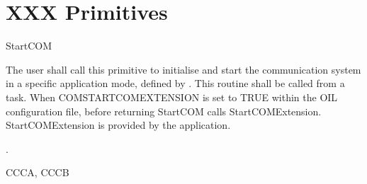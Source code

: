 




\pagebreak


\section{XXX Primitives}


\pagebreak


\begin{function}{StartCOM}
  \begin{fundescription}
    The user shall call this primitive to initialise and start the  communication system in a specific application mode, defined by . This routine shall be called from a task. When COMSTARTCOMEXTENSION  is set to TRUE within the OIL configuration file, before returning StartCOM calls StartCOMExtension. StartCOMExtension is provided by the application.  
  \end{fundescription}
  \begin{funparameters}
  \end{funparameters}
  \begin{funreturn}
    .
  \end{funreturn}
  \begin{funconformance}
    CCCA, CCCB
  \end{funconformance}
\end{function}

